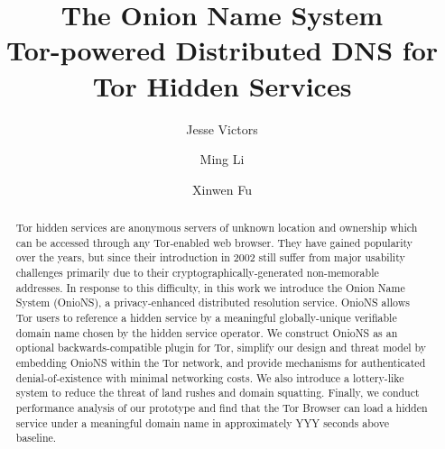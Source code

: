 \documentclass[USenglish,oneside,twocolumn]{article}
\begin{document}
\author[1]{Jesse Victors}
\author[2]{Ming Li}
\author[3]{Xinwen Fu}


\title{\huge The Onion Name System \large \\ Tor-powered Distributed DNS for Tor Hidden Services}

\begin{abstract} {
Tor hidden services are anonymous servers of unknown location and ownership which can be accessed through any Tor-enabled web browser. They have gained popularity over the years, but since their introduction in 2002 still suffer from major usability challenges primarily due to their cryptographically-generated non-memorable addresses. \newline \hspace*{1em} In response to this difficulty, in this work we introduce the Onion Name System (OnioNS), a privacy-enhanced distributed resolution service. OnioNS allows Tor users to reference a hidden service by a meaningful globally-unique verifiable domain name chosen by the hidden service operator. We construct OnioNS as an optional backwards-compatible plugin for Tor, simplify our design and threat model by embedding OnioNS within the Tor network, and provide mechanisms for authenticated denial-of-existence with minimal networking costs. We also introduce a lottery-like system to reduce the threat of land rushes and domain squatting. Finally, we conduct performance analysis of our prototype and find that the Tor Browser can load a hidden service under a meaningful domain name in approximately YYY seconds above baseline.
}
\end{abstract}
  

\end{document}
